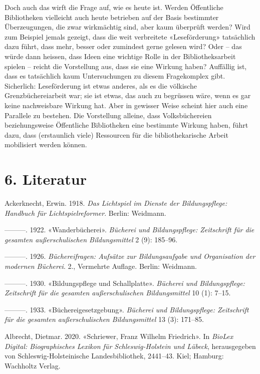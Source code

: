 \documentclass[a4paper,
fontsize=11pt,
oneside,
numbers=noperiodatend,
parskip=half-,
bibliography=totoc,
final
]{scrartcl}
\begin{document}
Doch auch das wirft die Frage auf, wie es heute ist. Werden Öffentliche
Bibliotheken vielleicht auch heute betrieben auf der Basis bestimmter
Überzeugungen, die zwar wirkmächtig sind, aber kaum überprüft werden?
Wird zum Beispiel jemals gezeigt, dass die weit verbreitete
«Leseförderung» tatsächlich dazu führt, dass mehr, besser oder zumindest
gerne gelesen wird? Oder -- das würde dann heissen, dass Ideen eine
wichtige Rolle in der Bibliotheksarbeit spielen -- reicht die
Vorstellung aus, dass sie eine Wirkung haben? Auffällig ist, dass es
tatsächlich kaum Untersuchungen zu diesem Fragekomplex gibt. Sicherlich:
Leseförderung ist etwas anderes, als es die völkische
Grenzbüchereiarbeit war; sie ist etwas, das auch zu begrüssen wäre, wenn
es gar keine nachweisbare Wirkung hat. Aber in gewisser Weise scheint
hier auch eine Parallele zu bestehen. Die Vorstellung alleine, dass
Volksbüchereien beziehungsweise Öffentliche Bibliotheken eine bestimmte
Wirkung haben, führt dazu, dass (erstaunlich viele) Ressourcen für die
bibliothekarische Arbeit mobilisiert werden können.

\hypertarget{literatur}{%
\section{6. Literatur}\label{literatur}}

Ackerknecht, Erwin. 1918. \emph{Das Lichtspiel im Dienste der
Bildungspflege: Handbuch für Lichtspielreformer}. Berlin: Weidmann.

---------. 1922. «Wanderbücherei». \emph{Bücherei und Bildungspflege:
Zeitschrift für die gesamten außerschulischen Bildungsmittel} 2 (9):
185--96.

---------. 1926. \emph{Büchereifragen: Aufsätze zur Bildungsaufgabe und
Organisation der modernen Bücherei}. 2., Vermehrte Auflage. Berlin:
Weidmann.

---------. 1930. «Bildungspflege und Schallplatte». \emph{Bücherei und
Bildungspflege: Zeitschrift für die gesamten außerschulischen
Bildungsmittel} 10 (1): 7--15.

---------. 1933. «Büchereigesetzgebung». \emph{Bücherei und
Bildungspflege: Zeitschrift für die gesamten außerschulischen
Bildungsmittel} 13 (3): 171--85.

Albrecht, Dietmar. 2020. «Schriewer, Franz Wilhelm Friedrich». In
\emph{BioLex Digital: Biographisches Lexikon für Schleswig-Holstein und
Lübeck}, herausgegeben von Schleswig-Holsteinische Landesbibliothek,
2441--43. Kiel; Hamburg: Wachholtz Verlag.
\end{document}
